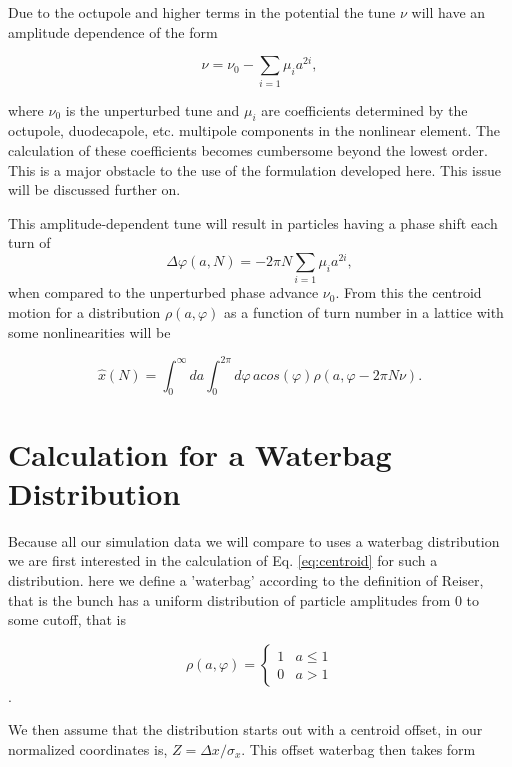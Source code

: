 \documentclass[]{article}
\begin{document}
Due to the octupole and higher terms in the potential the tune $\nu$ will have an 
amplitude dependence of the form

\begin{equation} \label{eq:tune}
\nu = \nu_0 - \sum_{i=1} \mu_i a^{2i},
\end{equation}

where $\nu_0$ is the unperturbed tune and $\mu_i$ are coefficients determined by the 
octupole, duodecapole, etc. multipole components in the nonlinear element. The 
calculation of these coefficients becomes cumbersome beyond the lowest order. This is a 
major obstacle to the use of the formulation developed here. This issue will be discussed 
further on.

This amplitude-dependent tune will result in particles having a phase shift each turn of
\begin{equation}
	\Delta \varphi(a, N) = -2 \pi N \sum_{i=1} \mu_i a^{2i},
\end{equation}
when compared to the unperturbed phase advance $\nu_0$. From this the centroid 
motion for a distribution $\rho(a, \varphi)$ as a function of turn number in a lattice with 
some nonlinearities will be

\begin{equation} \label{eq:centroid}
\hat{x}(N) = \int_{0}^{\infty}da \int_{0}^{2\pi}d\varphi \, a cos(\varphi) \rho(a,
\varphi -
2\pi N \nu).
\end{equation}

\section{Calculation for a Waterbag Distribution}

Because all our simulation data we will compare to uses a waterbag distribution we are 
first interested in the calculation of Eq. \ref{eq:centroid} for such a distribution. here we 
define a 'waterbag' according to the definition of Reiser, that is the bunch has a uniform 
distribution of particle amplitudes from 0 to some cutoff, that is

\begin{equation} \label{eq:waterbag}
\rho(a, \varphi) =
\left\{
\begin{array}{lr}
1 &  a \leq 1 \\
0 &  a > 1
\end{array}
\right.
\end{equation}. 

We then assume that the distribution starts out with a centroid offset, in our normalized 
coordinates is, $Z = \Delta x / \sigma_x$. This offset waterbag then takes form
\end{document}
